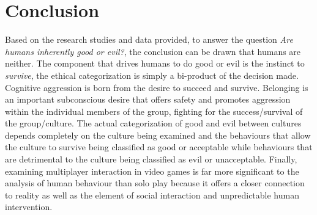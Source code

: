 \documentclass[12pt]{report}
\begin{document}
\chapter {Conclusion}
Based on the research studies and data provided, to answer the question \textit{Are humans inherently good or evil?}, the conclusion can be drawn that humans are neither. The component that drives humans to do good or evil is the instinct to \textit{survive}, the ethical categorization is simply a bi-product of the decision made. Cognitive aggression is born from the desire to succeed and survive. Belonging is an important subconscious desire that offers safety and promotes aggression within the individual members of the group, fighting for the success/survival of the group/culture. The actual categorization of good and evil between cultures depends completely on the culture being examined and the behaviours that allow the culture to survive being classified as good or acceptable while behaviours that are detrimental to the culture being classified as evil or unacceptable. Finally, examining multiplayer interaction in video games is far more significant to the analysis of human behaviour than solo play because it offers a closer connection to reality as well as the element of social interaction and unpredictable human intervention.



\end{document}
